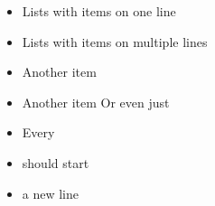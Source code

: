 \documentclass{article}
\begin{document}
\begin{itemize}

  \item Lists with items on one line

  \item Lists with items
    on multiple lines

  \item Another item

  \item Another item
    Or even just %

  \item Every
  \item should start
  \item a new line

\end{itemize}
\end{document}

